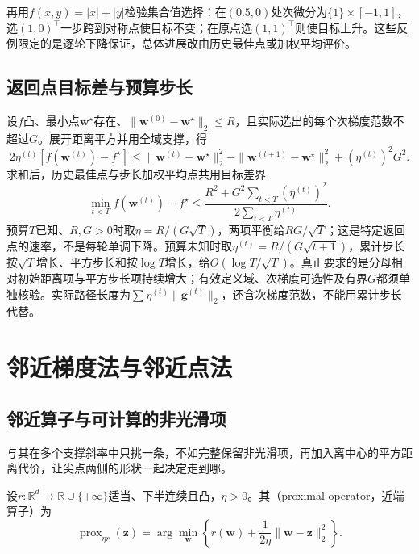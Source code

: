 再用$f(x,y)=|x|+|y|$检验集合值选择：在$(0.5,0)$处次微分为$\{1\}\times[-1,1]$，选$(1,0)^\top$一步跨到对称点使目标不变；在原点选$(1,1)^\top$则使目标上升。这些反例限定的是逐轮下降保证，总体进展改由历史最佳点或加权平均评价。

\subsection{返回点目标差与预算步长}

设$f$凸、最小点$\bm w^\star$存在、$\|\bm w^{(0)}-\bm w^\star\|_2\leq R$，且实际选出的每个次梯度范数不超过$G$。展开距离平方并用全域支撑，得
\[
 2\eta^{(t)}[f(\bm w^{(t)})-f^\star]
 \leq\|\bm w^{(t)}-\bm w^\star\|_2^2
 -\|\bm w^{(t+1)}-\bm w^\star\|_2^2
 +(\eta^{(t)})^2G^2.
\]
求和后，历史最佳点与步长加权平均点共用目标差界
\begin{equation}
 \min_{t<T}f(\bm w^{(t)})-f^\star
 \leq
 \frac{R^2+G^2\sum_{t<T}(\eta^{(t)})^2}
 {2\sum_{t<T}\eta^{(t)}}.
 \label{eq:opt-subgradient-finite-rate}
\end{equation}
预算$T$已知、$R,G>0$时取$\eta=R/(G\sqrt T)$，两项平衡给$RG/\sqrt T$；这是特定返回点的速率，不是每轮单调下降。预算未知时取$\eta^{(t)}=R/(G\sqrt{t+1})$，累计步长按$\sqrt T$增长、平方步长和按$\log T$增长，给$O(\log T/\sqrt T)$。真正要求的是分母相对初始距离项与平方步长项持续增大；有效定义域、次梯度可选性及有界$G$都须单独核验。实际路径长度为$\sum\eta^{(t)}\|\bm g^{(t)}\|_2$，还含次梯度范数，不能用累计步长代替。

\section{邻近梯度法与邻近点法}

\subsection{邻近算子与可计算的非光滑项}

与其在多个支撑斜率中只挑一条，不如完整保留非光滑项，再加入离中心的平方距离代价，让尖点两侧的形状一起决定走到哪。

\begin{definition}[邻近算子]
\label{def:opt-proximal-operator}
设$r:\mathbb R^d\to\mathbb R\cup\{+\infty\}$适当、下半连续且凸，$\eta>0$。其（proximal operator，近端算子）为
\[
 \operatorname{prox}_{\eta r}(\bm z)
 =\arg\min_{\bm w}\left\{
 r(\bm w)+\frac{1}{2\eta}\lVert\bm w-\bm z\rVert_2^2
 \right\}.
\]
\end{definition}

